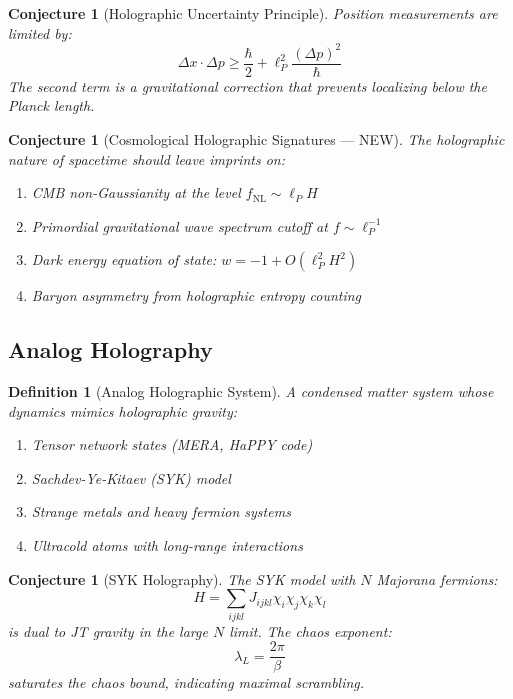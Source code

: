 \documentclass[12pt,a4paper]{article}
\newtheorem{conjecture}[theorem]{Conjecture}
\newtheorem{definition}[theorem]{Definition}
\begin{document}
\begin{conjecture}[Holographic Uncertainty Principle]
Position measurements are limited by:
\begin{equation}
\Delta x \cdot \Delta p \geq \frac{\hbar}{2} + \ell_P^2 \frac{(\Delta p)^2}{\hbar}
\end{equation}
The second term is a gravitational correction that prevents localizing below the Planck length.
\end{conjecture}

\begin{conjecture}[Cosmological Holographic Signatures --- NEW]
The holographic nature of spacetime should leave imprints on:
\begin{enumerate}
    \item CMB non-Gaussianity at the level $f_{\text{NL}} \sim \ell_P H$
    \item Primordial gravitational wave spectrum cutoff at $f \sim \ell_P^{-1}$
    \item Dark energy equation of state: $w = -1 + O(\ell_P^2 H^2)$
    \item Baryon asymmetry from holographic entropy counting
\end{enumerate}
\end{conjecture}

\subsection{Analog Holography}

\begin{definition}[Analog Holographic System]
A condensed matter system whose dynamics mimics holographic gravity:
\begin{enumerate}
    \item Tensor network states (MERA, HaPPY code)
    \item Sachdev-Ye-Kitaev (SYK) model
    \item Strange metals and heavy fermion systems
    \item Ultracold atoms with long-range interactions
\end{enumerate}
\end{definition}

\begin{conjecture}[SYK Holography]
The SYK model with $N$ Majorana fermions:
\begin{equation}
H = \sum_{ijkl} J_{ijkl} \chi_i \chi_j \chi_k \chi_l
\end{equation}
is dual to JT gravity in the large $N$ limit. The chaos exponent:
\begin{equation}
\lambda_L = \frac{2\pi}{\beta}
\end{equation}
saturates the chaos bound, indicating maximal scrambling.
\end{conjecture}
\end{document}
